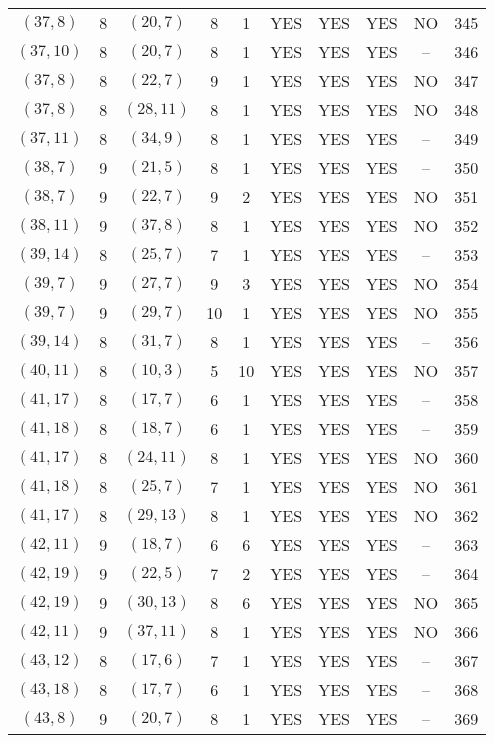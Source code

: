 \begin{longtable}{|c|c|c|c|c|c|c|c|c|c|}
$(37, 8)$ & 8 & $(20, 7)$ & 8 & 1 & YES & YES & YES & NO & 345\\
$(37, 10)$ & 8 & $(20, 7)$ & 8 & 1 & YES & YES & YES & -- & 346\\
$(37, 8)$ & 8 & $(22, 7)$ & 9 & 1 & YES & YES & YES & NO & 347\\
$(37, 8)$ & 8 & $(28, 11)$ & 8 & 1 & YES & YES & YES & NO & 348\\
$(37, 11)$ & 8 & $(34, 9)$ & 8 & 1 & YES & YES & YES & -- & 349\\
$(38, 7)$ & 9 & $(21, 5)$ & 8 & 1 & YES & YES & YES & -- & 350\\
$(38, 7)$ & 9 & $(22, 7)$ & 9 & 2 & YES & YES & YES & NO & 351\\
$(38, 11)$ & 9 & $(37, 8)$ & 8 & 1 & YES & YES & YES & NO & 352\\
$(39, 14)$ & 8 & $(25, 7)$ & 7 & 1 & YES & YES & YES & -- & 353\\
$(39, 7)$ & 9 & $(27, 7)$ & 9 & 3 & YES & YES & YES & NO & 354\\
$(39, 7)$ & 9 & $(29, 7)$ & 10 & 1 & YES & YES & YES & NO & 355\\
$(39, 14)$ & 8 & $(31, 7)$ & 8 & 1 & YES & YES & YES & -- & 356\\
$(40, 11)$ & 8 & $(10, 3)$ & 5 & 10 & YES & YES & YES & NO & 357\\
$(41, 17)$ & 8 & $(17, 7)$ & 6 & 1 & YES & YES & YES & -- & 358\\
$(41, 18)$ & 8 & $(18, 7)$ & 6 & 1 & YES & YES & YES & -- & 359\\
$(41, 17)$ & 8 & $(24, 11)$ & 8 & 1 & YES & YES & YES & NO & 360\\
$(41, 18)$ & 8 & $(25, 7)$ & 7 & 1 & YES & YES & YES & NO & 361\\
$(41, 17)$ & 8 & $(29, 13)$ & 8 & 1 & YES & YES & YES & NO & 362\\
$(42, 11)$ & 9 & $(18, 7)$ & 6 & 6 & YES & YES & YES & -- & 363\\
$(42, 19)$ & 9 & $(22, 5)$ & 7 & 2 & YES & YES & YES & -- & 364\\
$(42, 19)$ & 9 & $(30, 13)$ & 8 & 6 & YES & YES & YES & NO & 365\\
$(42, 11)$ & 9 & $(37, 11)$ & 8 & 1 & YES & YES & YES & NO & 366\\
$(43, 12)$ & 8 & $(17, 6)$ & 7 & 1 & YES & YES & YES & -- & 367\\
$(43, 18)$ & 8 & $(17, 7)$ & 6 & 1 & YES & YES & YES & -- & 368\\
$(43, 8)$ & 9 & $(20, 7)$ & 8 & 1 & YES & YES & YES & -- & 369\\

\end{longtable}
